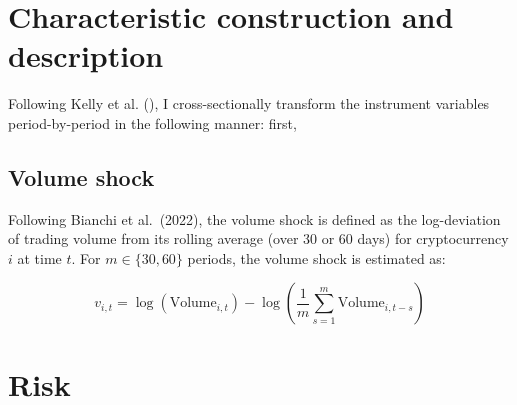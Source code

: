 \documentclass[
  12pt,
  a4paper,
  openany]{scrbook}
\begin{document}
\begin{table}[t]
\centering
\caption[Summary statistics of daily excess returns]%
{\textbf{Summary statistics of daily excess returns.} 
The table reports the summary statistics of daily returns on the dataset used in the empirical analysis. The columns represent the number of daily observations, the quantity of unique coins over the whole sample period, the minimum size of the cross-section, the mean of the excess returns, the standard deviation, and the 10th percentile, lower quartile, median, upper quartile, and 90th percentile of the distribution of the returns. The sample period is from June 1, 2018, to July 31, 2025.}
\label{tbl-sampleoverview}
\end{table}

\section{Characteristic construction and
description}\label{sec-characteristics}

Following Kelly et al.
(), I cross-sectionally
transform the instrument variables period-by-period in the following
manner: first,

\subsection{Volume shock}\label{volume-shock}

Following Bianchi et al.~(2022), the volume shock is defined as the
log-deviation of trading volume from its rolling average (over 30 or 60
days) for cryptocurrency \(i\) at time \(t\). For \(m \in \{30, 60\}\)
periods, the volume shock is estimated as:

\[
v_{i,t} = \log(\text{Volume}_{i,t}) - \log\left( \frac{1}{m} \sum_{s=1}^{m} \text{Volume}_{i,t-s} \right)
\]

\section{Risk}\label{risk}
\end{document}
